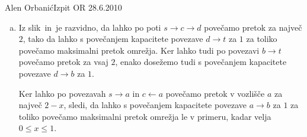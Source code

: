 \begin{naloga}{Alen Orbanić}{Izpit OR 28.6.2010}
\begin{odgovor}
\begin{enumerate}[(a)]
\item Iz slik~ in~ je razvidno,
da lahko po poti $s \to c \to d$ povečamo pretok za največ $2$,
tako da lahko s povečanjem kapacitete povezave $d \to t$ za $1$
za toliko povečamo maksimalni pretok omrežja.
Ker lahko tudi po povezavi $b \to t$ povečamo pretok za vsaj $2$,
enako dosežemo tudi s povečanjem kapacitete povezave $d \to b$ za $1$.

Ker lahko po povezavah $s \to a$ in $c \gets a$
povečamo pretok v vozlišče $a$ za največ $2-x$,
sledi, da lahko s povečanjem kapacitete povezave $a \to b$ za $1$
za toliko povečamo maksimalni pretok omrežja le v primeru,
kadar velja $0 \le x \le 1$.
\end{enumerate}

\begin{slika}[p]
\end{slika}
\begin{slika}[p]
\end{slika}
\begin{slika}[p]
\end{slika}
\end{odgovor}
\end{naloga}
